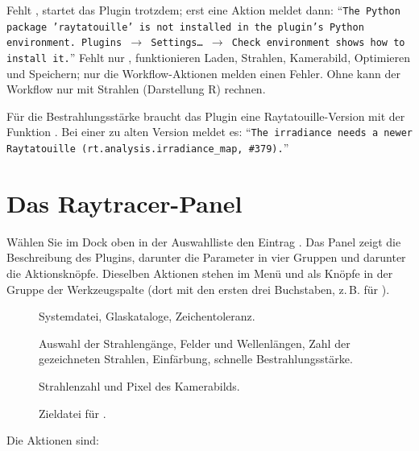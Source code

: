 \begin{hinweis}
Fehlt , startet das Plugin trotzdem; erst eine Aktion meldet dann:
\enquote{\texttt{The Python package 'raytatouille' is not installed in the plugin's Python
environment. Plugins $\to$ Settings… $\to$ Check environment shows how to install it.}}
Fehlt nur , funktionieren Laden, Strahlen, Kamerabild, Optimieren und
Speichern; nur die Workflow-Aktionen melden einen Fehler. Ohne  kann der
Workflow nur mit Strahlen (Darstellung R) rechnen.
\end{hinweis}

Für die Bestrahlungsstärke braucht das Plugin eine Raytatouille-Version mit der Funktion
. Bei einer zu alten Version meldet es: \enquote{\texttt{The
irradiance needs a newer Raytatouille (rt.analysis.irradiance\_map, \#379).}}

\section{Das Raytracer-Panel}\label{sec:rt-panel}

Wählen Sie im Dock  oben in der Auswahlliste den Eintrag . Das Panel
zeigt die Beschreibung des Plugins, darunter die Parameter in vier Gruppen und darunter die
Aktionsknöpfe. Dieselben Aktionen stehen im Menü  und als Knöpfe in der
Gruppe  der Werkzeugspalte (dort mit den ersten drei Buchstaben, z.\,B.
 für ).

\begin{description}
  \item[] Systemdatei, Glaskataloge, Zeichentoleranz.
  \item[] Auswahl der Strahlengänge, Felder und Wellenlängen, Zahl der gezeichneten
    Strahlen, Einfärbung, schnelle Bestrahlungsstärke.
  \item[] Strahlenzahl und Pixel des Kamerabilds.
  \item[] Zieldatei für .
\end{description}

Die Aktionen sind:

